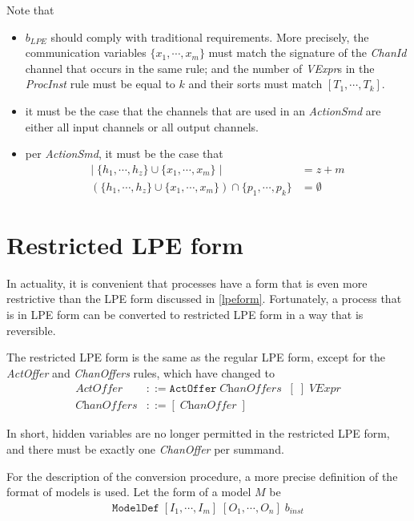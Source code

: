 Note that
\begin{itemize}
\item $b_\textit{LPE}$ should comply with traditional \txs{} requirements.
More precisely, the communication variables $\{ x_1, \cdots{}, x_m \}$ must match the signature of the \textit{ChanId} channel that occurs in the same rule; and the number of \textit{VExpr}s in the \textit{ProcInst} rule must be equal to $k$ and their sorts must match $[T_1, \cdots{}, T_k]$.
\item it must be the case that the channels that are used in an \textit{ActionSmd} are either all input channels or all output channels.
\item per \textit{ActionSmd}, it must be the case that
\begin{align*}
|\; \{ h_1, \cdots{}, h_z \} \cup \{ x_1, \cdots{}, x_m \} \; | &= z + m \\
(\{ h_1, \cdots{}, h_z \} \cup \{ x_1, \cdots{}, x_m \}) \cap \{ p_1, \cdots{}, p_k \} &= \emptyset{}
\end{align*}
\end{itemize}

\section{Restricted LPE form} \label{restrictedlpeform}

In actuality, it is convenient that processes have a form that is even more restrictive than the LPE form discussed in \ref{lpeform}.
Fortunately, a process that is in LPE form can be converted to restricted LPE form in a way that is reversible.

The restricted LPE form is the same as the regular LPE form, except for the \textit{ActOffer} and \textit{ChanOffers} rules, which have changed to
\begin{align*}
\textit{ActOffer} &::= \texttt{ActOffer} \; \textit{ChanOffers} \;\; [\;] \; \textit{VExpr} \\
\textit{ChanOffers} &::= [ \;\! \textit{ChanOffer} \; ]
\end{align*}

In short, hidden variables are no longer permitted in the restricted LPE form, and there must be exactly one \textit{ChanOffer} per summand.

For the description of the conversion procedure, a more precise definition of the format of \txs{} models is used.
Let the form of a \txs{} model $M$ be
\begin{align*}
\texttt{ModelDef} \; [I_1, \cdots{}, I_m] \; [O_1, \cdots{}, O_n] \; b_\textit{inst}
\end{align*}

